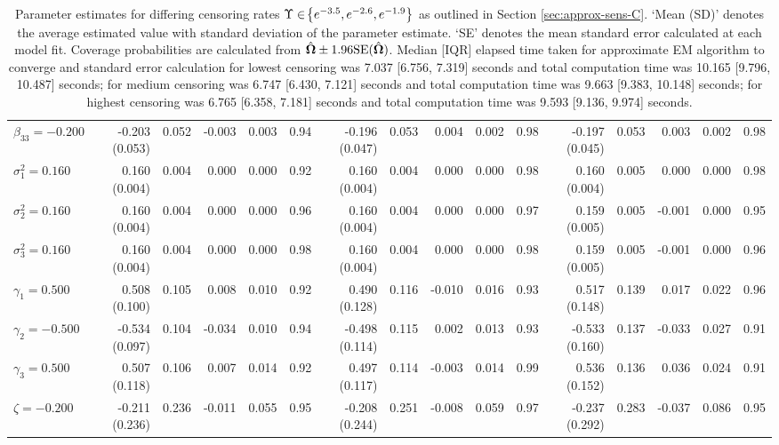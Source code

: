 \begin{landscape}
\begin{table}[ht]
\begin{tabular}{l|rrrrr:rrrrr:rrrrr}
  $\beta_{33} = -0.200$ & -0.203 (0.053) & 0.052 & -0.003 & 0.003 & 0.94 & -0.196 (0.047) & 0.053 &  0.004 & 0.002 & 0.98 & -0.197 (0.045) & 0.053 &  0.003 & 0.002 & 0.98 \\ 
  $\sigma^2_1 = 0.160$ &  0.160 (0.004) & 0.004 &  0.000 & 0.000 & 0.92 &  0.160 (0.004) & 0.004 &  0.000 & 0.000 & 0.98 &  0.160 (0.004) & 0.005 &  0.000 & 0.000 & 0.98 \\ 
  $\sigma^2_2 = 0.160$ &  0.160 (0.004) & 0.004 &  0.000 & 0.000 & 0.96 &  0.160 (0.004) & 0.004 &  0.000 & 0.000 & 0.97 &  0.159 (0.005) & 0.005 & -0.001 & 0.000 & 0.95 \\ 
  $\sigma^2_3 = 0.160$ &  0.160 (0.004) & 0.004 &  0.000 & 0.000 & 0.98 &  0.160 (0.004) & 0.004 &  0.000 & 0.000 & 0.98 &  0.159 (0.005) & 0.005 & -0.001 & 0.000 & 0.96 \\ 
  $\gamma_1 = 0.500$ &  0.508 (0.100) & 0.105 &  0.008 & 0.010 & 0.92 &  0.490 (0.128) & 0.116 & -0.010 & 0.016 & 0.93 &  0.517 (0.148) & 0.139 &  0.017 & 0.022 & 0.96 \\ 
  $\gamma_2 = -0.500$ & -0.534 (0.097) & 0.104 & -0.034 & 0.010 & 0.94 & -0.498 (0.114) & 0.115 &  0.002 & 0.013 & 0.93 & -0.533 (0.160) & 0.137 & -0.033 & 0.027 & 0.91 \\ 
  $\gamma_3 = 0.500$ &  0.507 (0.118) & 0.106 &  0.007 & 0.014 & 0.92 &  0.497 (0.117) & 0.114 & -0.003 & 0.014 & 0.99 &  0.536 (0.152) & 0.136 &  0.036 & 0.024 & 0.91 \\ 
  $\zeta = -0.200$ & -0.211 (0.236) & 0.236 & -0.011 & 0.055 & 0.95 & -0.208 (0.244) & 0.251 & -0.008 & 0.059 & 0.97 & -0.237 (0.292) & 0.283 & -0.037 & 0.086 & 0.95 \\ 
   \hline
\end{tabular}
\endgroup
\caption{Parameter estimates for differing censoring rates $\Upsilon\in\!\left\{ e^{-3.5}, e^{-2.6}, e^{-1.9}\right\}$ as outlined in Section \ref{sec:approx-sens-C}. `Mean (SD)' denotes the average estimated value with standard deviation of the parameter estimate. `SE' denotes the mean standard error calculated at each model fit. Coverage probabilities are calculated from $\hat{\bm{\Omega}}\pm1.96\mathrm{SE}(\hat{\bm{\Omega}})$. Median [IQR] elapsed time taken for approximate EM algorithm to converge and standard error calculation for lowest censoring was 7.037 [6.756, 7.319] seconds and total computation time was 10.165 [9.796, 10.487] seconds; for medium censoring was 6.747 [6.430, 7.121] seconds and total computation time was 9.663 [9.383, 10.148] seconds; for highest censoring was 6.765 [6.358, 7.181] seconds and total computation time was 9.593 [9.136, 9.974] seconds.} 
\end{table}
\vfill
\lscapepageno
\end{landscape}
\restoregeometry
\clearpage
\resettocappx
